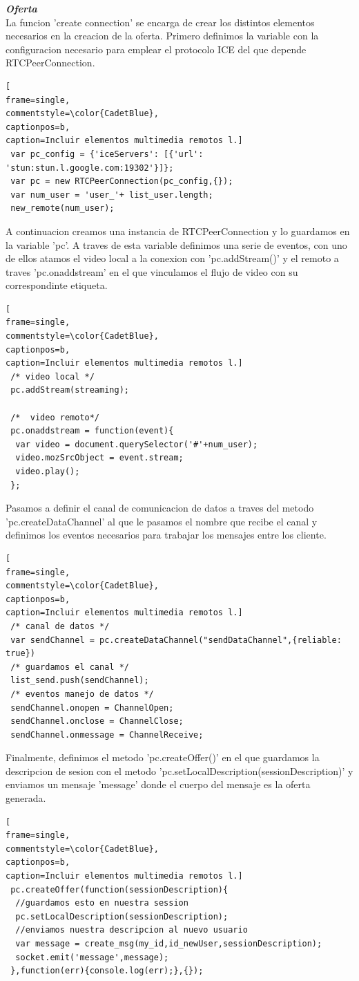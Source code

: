 \textbf{\textit{Oferta}} 
\\La funcion 'create connection' se encarga de crear los distintos elementos necesarios en la creacion de la oferta. Primero definimos la variable con la configuracion necesario para emplear el protocolo ICE del que depende RTCPeerConnection.
\begin{lstlisting}[
frame=single,
commentstyle=\color{CadetBlue},
captionpos=b,
caption=Incluir elementos multimedia remotos l.]
 var pc_config = {'iceServers': [{'url': 'stun:stun.l.google.com:19302'}]};
 var pc = new RTCPeerConnection(pc_config,{});
 var num_user = 'user_'+ list_user.length;
 new_remote(num_user);
\end{lstlisting}
A continuacion creamos una instancia de RTCPeerConnection y lo guardamos en la variable 'pc'. A traves de esta variable definimos una serie de eventos, con uno de ellos atamos el video local a la conexion con 'pc.addStream()' y el remoto a traves 'pc.onaddstream' en el que vinculamos el flujo de video con su correspondinte etiqueta.
\begin{lstlisting}[
frame=single,
commentstyle=\color{CadetBlue},
captionpos=b,
caption=Incluir elementos multimedia remotos l.]
 /* video local */
 pc.addStream(streaming);

 /*  video remoto*/
 pc.onaddstream = function(event){
  var video = document.querySelector('#'+num_user);
  video.mozSrcObject = event.stream;
  video.play();
 };
\end{lstlisting}
Pasamos a definir el canal de comunicacion de datos a traves del metodo 'pc.createDataChannel'  al que le pasamos el nombre que recibe el canal y definimos los eventos necesarios para trabajar los mensajes entre los cliente.
\begin{lstlisting}[
frame=single,
commentstyle=\color{CadetBlue},
captionpos=b,
caption=Incluir elementos multimedia remotos l.]
 /* canal de datos */
 var sendChannel = pc.createDataChannel("sendDataChannel",{reliable: true})
 /* guardamos el canal */
 list_send.push(sendChannel);	
 /* eventos manejo de datos */
 sendChannel.onopen = ChannelOpen;
 sendChannel.onclose = ChannelClose;
 sendChannel.onmessage = ChannelReceive;
\end{lstlisting}
Finalmente, definimos el metodo 'pc.createOffer()' en el que guardamos la descripcion de sesion con el metodo 'pc.setLocalDescription(sessionDescription)' y enviamos un mensaje 'message' donde el cuerpo del mensaje es la oferta generada.
\begin{lstlisting}[
frame=single,
commentstyle=\color{CadetBlue},
captionpos=b,
caption=Incluir elementos multimedia remotos l.]
 pc.createOffer(function(sessionDescription){
  //guardamos esto en nuestra session
  pc.setLocalDescription(sessionDescription);
  //enviamos nuestra descripcion al nuevo usuario
  var message = create_msg(my_id,id_newUser,sessionDescription);
  socket.emit('message',message);
 },function(err){console.log(err);},{});
\end{lstlisting}

